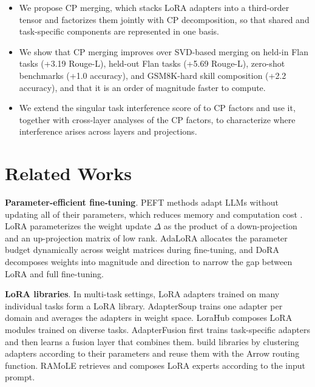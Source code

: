 \documentclass[10pt]{article} %
\begin{document}
\begin{itemize}
    \item We propose CP merging, which stacks LoRA adapters into a third-order tensor and factorizes them jointly with CP decomposition, so that shared and task-specific components are represented in one basis.

    \item We show that CP merging improves over SVD-based merging on held-in Flan tasks (+3.19 Rouge-L), held-out Flan tasks (+5.69 Rouge-L), zero-shot benchmarks (+1.0 accuracy), and GSM8K-hard skill composition (+2.2 accuracy), and that it is an order of magnitude faster to compute.

    \item We extend the singular task interference score of \citet{gargiulo2025task} to CP factors and use it, together with cross-layer analyses of the CP factors, to characterize where interference arises across layers and projections.
\end{itemize}


\section{Related Works}

    \noindent
    \textbf{Parameter-efficient fine-tuning}. PEFT methods adapt LLMs
    without updating all of their parameters, which reduces memory and
    computation cost \citep{adapter_layer,zhang2024llama,zaken2022bitfit,guo2021parameter,li2021prefix,lester2021power}.
    LoRA \citep{hu2021lora} parameterizes the weight update $\Delta$ as the
    product of a down-projection and an up-projection matrix of low rank.
    AdaLoRA \citep{zhang2023adaptive} allocates the parameter budget
    dynamically across weight matrices during fine-tuning, and DoRA
    \citep{liu2024dora} decomposes weights into magnitude and direction to
    narrow the gap between LoRA and full fine-tuning.

    \noindent
    \textbf{LoRA libraries}. In multi-task settings, LoRA adapters trained on many individual tasks form a LoRA library.
    AdapterSoup \citep{chronopoulou2023adaptersoup} trains one adapter per
    domain and averages the adapters in weight space. LoraHub \citep{huang2023lorahub}
    composes LoRA modules trained on diverse tasks. AdapterFusion \citep{pfeiffer2021adapterfusion}
    first trains task-specific adapters and then learns a fusion layer that
    combines them. \citet{ostapenko2024towards} build libraries by clustering
    adapters according to their parameters and reuse them with the Arrow
    routing function. RAMoLE \citep{zhao2024retrieval} retrieves and composes
    LoRA experts according to the input prompt.
\end{document}
